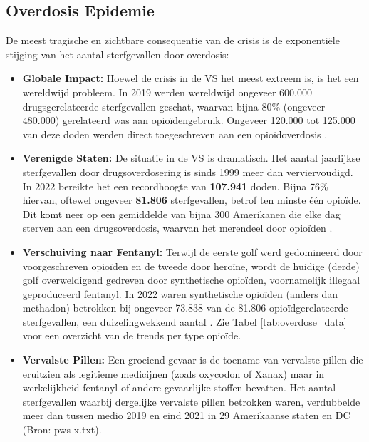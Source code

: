 \documentclass[11pt, a4paper]{report} %
\begin{document}
\subsection{Overdosis Epidemie}
De meest tragische en zichtbare consequentie van de crisis is de exponentiële stijging van het aantal sterfgevallen door overdosis:
\begin{itemize}
    \item \textbf{Globale Impact:} Hoewel de crisis in de VS het meest extreem is, is het een wereldwijd probleem. In 2019 werden wereldwijd ongeveer 600.000 drugsgerelateerde sterfgevallen geschat, waarvan bijna 80\% (ongeveer 480.000) gerelateerd was aan opioïdengebruik. Ongeveer 120.000 tot 125.000 van deze doden werden direct toegeschreven aan een opioïdoverdosis \parencite{WHO2023Opioid}.
    \item \textbf{Verenigde Staten:} De situatie in de VS is dramatisch. Het aantal jaarlijkse sterfgevallen door drugsoverdosering is sinds 1999 meer dan verviervoudigd. In 2022 bereikte het een recordhoogte van \textbf{107.941} doden. Bijna 76\% hiervan, oftewel ongeveer \textbf{81.806} sterfgevallen, betrof ten minste één opioïde. Dit komt neer op een gemiddelde van bijna 300 Amerikanen die elke dag sterven aan een drugsoverdosis, waarvan het merendeel door opioïden \parencite{CDC2024OverdoseData, FCCConnect2HealthOpioids}.
    \item \textbf{Verschuiving naar Fentanyl:} Terwijl de eerste golf werd gedomineerd door voorgeschreven opioïden en de tweede door heroïne, wordt de huidige (derde) golf overweldigend gedreven door synthetische opioïden, voornamelijk illegaal geproduceerd fentanyl. In 2022 waren synthetische opioïden (anders dan methadon) betrokken bij ongeveer 73.838 van de 81.806 opioïdgerelateerde sterfgevallen, een duizelingwekkend aantal \parencite{CDC2024DataBrief491}. Zie Tabel \ref{tab:overdose_data} voor een overzicht van de trends per type opioïde.
    \item \textbf{Vervalste Pillen:} Een groeiend gevaar is de toename van vervalste pillen die eruitzien als legitieme medicijnen (zoals oxycodon of Xanax) maar in werkelijkheid fentanyl of andere gevaarlijke stoffen bevatten. Het aantal sterfgevallen waarbij dergelijke vervalste pillen betrokken waren, verdubbelde meer dan tussen medio 2019 en eind 2021 in 29 Amerikaanse staten en DC (Bron: pws-x.txt).
\end{itemize}
\end{document}
